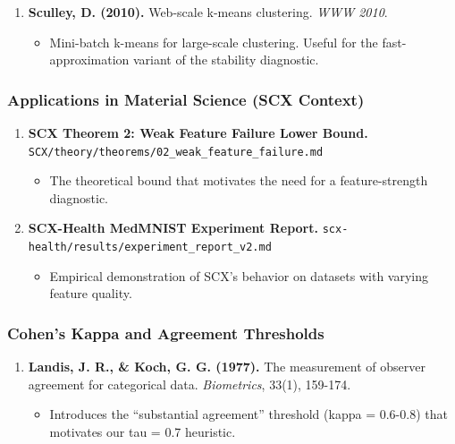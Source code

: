 \documentclass[
  12pt,
]{ctexart}
\providecommand{\tightlist}{%
  \setlength{\itemsep}{0pt}\setlength{\parskip}{0pt}}
\begin{document}
\begin{enumerate}
\def\labelenumi{\arabic{enumi}.}
\setcounter{enumi}{7}
\tightlist
\item
  \textbf{Sculley, D. (2010).} Web-scale k-means clustering. \emph{WWW
  2010}.

  \begin{itemize}
  \tightlist
  \item
    Mini-batch k-means for large-scale clustering. Useful for the
    fast-approximation variant of the stability diagnostic.
  \end{itemize}
\end{enumerate}

\subsubsection{Applications in Material Science (SCX
Context)}\label{applications-in-material-science-scx-context}

\begin{enumerate}
\def\labelenumi{\arabic{enumi}.}
\setcounter{enumi}{8}
\tightlist
\item
  \textbf{SCX Theorem 2: Weak Feature Failure Lower Bound.}
  \texttt{SCX/theory/theorems/02\_weak\_feature\_failure.md}

  \begin{itemize}
  \tightlist
  \item
    The theoretical bound that motivates the need for a feature-strength
    diagnostic.
  \end{itemize}
\item
  \textbf{SCX-Health MedMNIST Experiment Report.}
  \texttt{scx-health/results/experiment\_report\_v2.md}

  \begin{itemize}
  \tightlist
  \item
    Empirical demonstration of SCX's behavior on datasets with varying
    feature quality.
  \end{itemize}
\end{enumerate}

\subsubsection{Cohen's Kappa and Agreement
Thresholds}\label{cohens-kappa-and-agreement-thresholds}

\begin{enumerate}
\def\labelenumi{\arabic{enumi}.}
\setcounter{enumi}{10}
\tightlist
\item
  \textbf{Landis, J. R., \& Koch, G. G. (1977).} The measurement of
  observer agreement for categorical data. \emph{Biometrics}, 33(1),
  159-174.

  \begin{itemize}
  \tightlist
  \item
    Introduces the ``substantial agreement'' threshold (kappa = 0.6-0.8)
    that motivates our tau = 0.7 heuristic.
  \end{itemize}
\end{enumerate}
\end{document}
